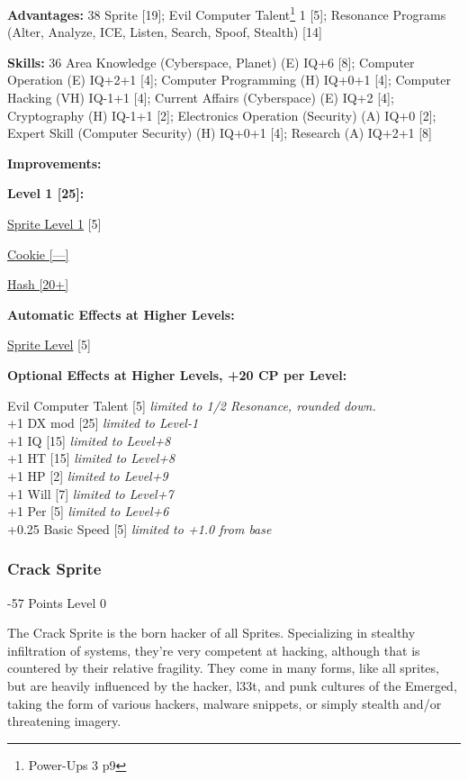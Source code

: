 \begin{multicols*}{3}
\textbf{Advantages:} 38
Sprite [19]; Evil Computer Talent\footnote{Power-Ups 3 p9} 1 [5]; Resonance Programs (Alter, Analyze, ICE, Listen, Search, Spoof, Stealth) [14]

\textbf{Skills:} 36
Area Knowledge (Cyberspace, Planet) (E) IQ+6 [8]; Computer Operation (E) IQ+2+1 [4]; Computer Programming (H) IQ+0+1 [4]; Computer Hacking (VH) IQ-1+1 [4]; Current Affairs (Cyberspace) (E) IQ+2 [4]; Cryptography (H) IQ-1+1 [2]; Electronics Operation (Security) (A) IQ+0 [2]; Expert Skill (Computer Security) (H) IQ+0+1 [4]; Research (A) IQ+2+1 [8]

\textbf{ Improvements:}

\textbf{Level 1 [25]:}

\hyperref[sprite_level]{Sprite Level 1} [5]

\hyperref[cookie]{Cookie [—]}

\hyperref[hash]{Hash [20+]}

\textbf{Automatic Effects at Higher Levels:}

\hyperref[sprite_level]{Sprite Level} [5]

\textbf{Optional Effects at Higher Levels, +20 CP per Level:}

Evil Computer Talent [5] \textit{limited to 1/2 Resonance, rounded down.}\\
+1 DX mod [25] \textit{limited to Level-1}\\
+1 IQ [15] \textit{limited to Level+8}\\
+1 HT [15] \textit{limited to Level+8}\\
+1 HP [2] \textit{limited to Level+9}\\
+1 Will [7] \textit{limited to Level+7}\\
+1 Per [5] \textit{limited to Level+6}\\
+0.25 Basic Speed [5] \textit{limited to +1.0 from base}\\

\subsubsection{Crack Sprite}
\begin{flushright}
	-57 Points Level 0
\end{flushright}

The Crack Sprite is the born hacker of all Sprites. Specializing in stealthy infiltration of systems, they're very competent at hacking, although that is countered by their relative fragility. They come in many forms, like all sprites, but are heavily influenced by the hacker, l33t, and punk cultures of the Emerged, taking the form of various hackers, malware snippets, or simply stealth and/or threatening imagery.


\end{multicols*}
